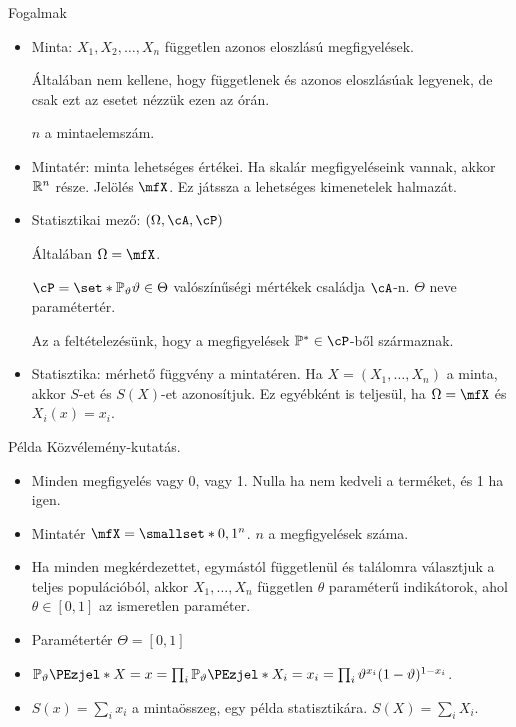 \documentclass[aspectratio=169,notheorems,9pt,\option]{beamer}
\begin{document}
\begin{frame}{Fogalmak}
  \begin{itemize}
    \item Minta: $X_1,X_2,\dots,X_n$ független azonos eloszlású megfigyelések.
    
    Általában nem kellene, hogy függetlenek és azonos eloszlásúak legyenek, 
    de csak ezt az esetet nézzük ezen az órán. 

    $n$ a mintaelemszám.
    \item Mintatér: minta lehetséges értékei. Ha skalár megfigyeléseink vannak, akkor $\mathbb{R}^n$ része.
    Jelölés $\mfX$. Ez játssza a lehetséges kimenetelek halmazát. 
    \item Statisztikai mező: $(\Omega,\cA,\cP)$ 
    
    Általában $\Omega=\mfX$.  
    
    $\cP=\set*{\P[\theta]}{\theta\in \Theta}$ valószínűségi mértékek családja $\cA$-n. 
    $\Theta$ neve paramétertér.
 
    Az a feltételezésünk, hogy a megfigyelések $\P^*\in\cP$-ből származnak.  

    \item Statisztika: mérhető függvény a mintatéren. Ha $X=(X_1,\dots,X_n)$ a minta, akkor 
    $S$-et és $S(X)$-et azonosítjuk. Ez egyébként is teljesül, ha $\Omega=\mfX$ és $X_i(x)=x_i$.
  \end{itemize}

\end{frame}

\begin{frame}{Példa}
  Közvélemény-kutatás.
  \begin{itemize}
    \item Minden megfigyelés vagy 0, vagy 1. Nulla ha nem kedveli a terméket, és 1 ha igen.
    \item Mintatér $\mfX=\smallset*{0,1}^n$. $n$ a megfigyelések száma.
    \item Ha minden megkérdezettet, egymástól függetlenül és találomra választjuk a teljes populációból, 
    akkor $X_1,\dots,X_n$ független $\theta$ paraméterű indikátorok, ahol $\theta\in[0,1]$ az ismeretlen paraméter.
    \item Paramétertér $\Theta=[0,1]$
    \item $\P[\theta]{X=x}=\prod_i \P[\theta]{X_i=x_i}=\prod_i \theta^{x_i}(1-\theta)^{1-x_i}$.
    \item $S(x)=\sum_i x_i$ a mintaösszeg, egy példa statisztikára. $S(X)=\sum_i X_i$. 
  \end{itemize}
\end{frame}
\end{document}
